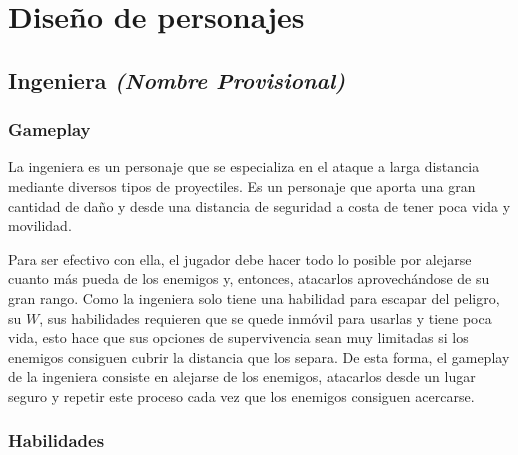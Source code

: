 \chapter{Diseño de personajes}


\section{Ingeniera \emph{(Nombre Provisional)}}

\subsection{Gameplay}
La ingeniera es un personaje que se especializa en el ataque a larga distancia mediante diversos tipos de proyectiles. Es un personaje que aporta una gran cantidad de daño y desde una distancia de seguridad a costa de tener poca vida y movilidad.

Para ser efectivo con ella, el jugador debe hacer todo lo posible por
alejarse cuanto más pueda de los enemigos y, entonces, atacarlos aprovechándose de su gran rango. Como la ingeniera solo tiene una habilidad para escapar del peligro, su $W$, sus habilidades requieren que se quede inmóvil para usarlas y tiene poca vida, esto hace que sus opciones de supervivencia sean muy limitadas si los enemigos consiguen cubrir la distancia que los separa. De esta forma, el gameplay de la ingeniera consiste en alejarse de los enemigos, atacarlos desde un lugar seguro y repetir este proceso cada vez que los enemigos consiguen acercarse.

\subsection{Habilidades}
